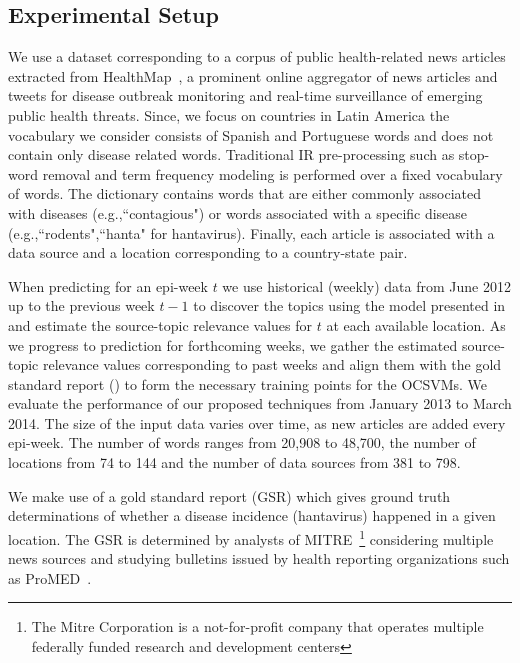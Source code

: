 \documentclass[twoside,leqno,twocolumn]{article}
\begin{document}
\subsection{Experimental Setup}
 We use a dataset corresponding to a corpus of public health-related news articles extracted from HealthMap~\cite{healthmap}, a prominent online aggregator of news articles and tweets for disease outbreak monitoring and real-time surveillance of emerging public health threats. Since, we focus on countries in Latin America the vocabulary we consider consists of Spanish and Portuguese words and does not contain only disease related words. Traditional IR pre-processing such as stop-word removal and term frequency modeling is performed over a fixed vocabulary of words. The dictionary contains words that are either commonly associated with diseases (e.g.,``contagious") or words associated with a specific disease (e.g.,``rodents",``hanta" for hantavirus). Finally, each article is associated with a data source and a location corresponding to a country-state pair.

When predicting for an epi-week $t$ we use historical (weekly) data from June 2012 up to the previous week $t-1$ to discover the topics using the model presented in  and estimate the source-topic relevance values for $t$ at each available location. As we progress to prediction for forthcoming weeks, we gather the estimated source-topic relevance values corresponding to past weeks and align them with the gold standard report () to  form the necessary training points for the OCSVMs. We evaluate the performance of our proposed techniques from January 2013 to March 2014. The size of the input data varies over time, as new articles are added every epi-week. The number of words ranges from 20,908 to 48,700, the number of locations from 74 to 144 and the number of data sources from 381 to 798.

 We make use of a gold standard report (GSR) which
gives ground truth determinations of whether a disease incidence
(hantavirus) happened in a given location. The GSR is determined by
analysts of MITRE~\footnote{The Mitre Corporation is a not-for-profit company that operates multiple federally funded research and development centers} considering multiple news sources and studying bulletins issued by health reporting organizations such as ProMED~\cite{probmed}.
\end{document}
